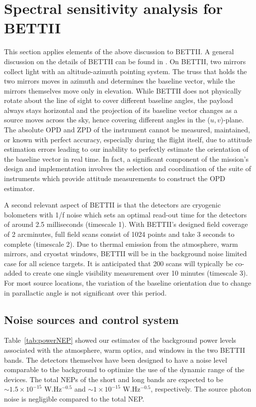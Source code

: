 \section{Spectral sensitivity analysis for BETTII}
\label{sec:implications}
This section applies elements of the above discussion to BETTII. A general discussion on the details of BETTII can be found in \citep{Rinehart:2014gk}.
On BETTII, two mirrors collect light with an altitude-azimuth pointing system. The truss that holds the two mirrors moves in azimuth and determines the baseline vector, while the mirrors themselves move only in elevation. While BETTII does not physically rotate about the line of sight to cover different baseline angles, the payload always stays horizontal and the projection of its baseline vector changes as a source moves across the sky, hence covering different angles in the ($u, v$)-plane. The absolute OPD and ZPD of the instrument cannot be
measured, maintained, or known with perfect accuracy, especially during the flight itself, due to attitude estimation errors leading to our inability to perfectly estimate the orientation of the baseline vector in real time. In fact, a significant component of the mission's
design and implementation involves the selection and coordination of the suite of instruments which provide attitude measurements to construct the OPD estimator.

A second relevant aspect of BETTII is that the detectors are cryogenic bolometers \cite[see][for similar architectures]{Staguhn:2014kl} with 1/f noise which
sets an optimal read-out time for the detectors of around 2.5 milliseconds (timescale 1). With BETTII's designed field coverage
of 2 arcminutes, full field scans consist of 1024 points and take 3 seconds to complete (timescale 2). Due to thermal emission from the atmosphere,
warm mirrors, and cryostat windows, BETTII will be in the background noise limited case for all science targets.
It is anticipated that 200 scans will typically be co-added to create one single visibility measurement over 10 minutes (timescale 3). 
For most source locations, the variation of the baseline orientation due to change in parallactic angle is not significant over this period.

\subsection{Noise sources and control system}
Table~\ref{tab:powerNEP} showed our estimates of the
background power levels associated with the atmosphere, warm optics, and windows in the two BETTII bands. 
The detectors themselves have been designed to have a noise level comparable to the background to optimize the use of the
dynamic range of the devices. The total NEPs of the short and long bands are expected to be $\sim 1.5\times 10^{-15}$ W.Hz$^{-0.5}$ and $\sim 1\times 10^{-15}$ W.Hz$^{-0.5}$, respectively. The source photon noise is negligible compared to the total NEP. 

